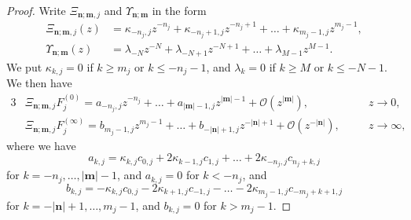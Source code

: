 \documentclass[reqno,centertags,11pt,draft]{amsart}
\begin{document}
\begin{proof}
    Write $\Xi_{\bm{n};\bm{m},j}$ and $\Upsilon_{\bm{n};\bm{m}}$ in the form 
    \begin{align*}\label{eq:lamdba}
         \Xi_{\bm{n};\bm{m},j} (z)&=  \kappa_{-n_j,j}z^{-n_j} + \kappa_{-n_j+1,j}z^{-n_j+1} + \ldots + \kappa_{m_j-1,j}z^{m_j-1}, \\ 
        \Upsilon_{\bm{n};\bm{m}}(z) & =\lambda_{-N}z^{-N} + \lambda_{-N+1}z^{-N+1} + \ldots + \lambda_{M-1}z^{M-1} .
    \end{align*}
    We put $\kappa_{k,j} = 0$ if $k \ge m_j$ or $k\le -n_j-1$, and %
    $\lambda_{k} = 0$ if $k \ge M$ or $k \le -N -1$. We then have 
    \begin{alignat*}{3}
        & \Xi_{\bm{n};\bm{m},j} F_j^{(0)} = a_{-n_j,j}z^{-n_j} + \ldots + a_{|\bm{m}|-1,j}z^{|\bm{m}|-1} + \mathcal{O}(z^{|\bm{m}|}), \quad &&z \rightarrow 0, \\
        & \Xi_{\bm{n};\bm{m},j} F_j^{(\infty)} = b_{m_j-1,j}z^{m_j-1} + \ldots + b_{-|\bm{n}|+1,j}z^{-|\bm{n}|+1} + \mathcal{O}(z^{-|\bm{n}|}), \quad  &&z \rightarrow \infty,
    \end{alignat*}
    where we have
    \begin{equation}
        \label{eq:coefficients of series 1 I}
        a_{k,j}  = \kappa_{k,j} c_{0,j}+ 2\kappa_{k-1,j}c_{1,j} + \ldots + 2\kappa_{-n_j,j} c_{n_j+k,j}
    \end{equation}
    for $k = -n_j,\ldots,|\bm{m}|-1$, and $a_{k,j}=0$ for $k <-n_j$, and
    \begin{equation}
        \label{eq:coefficients of series 2 I}
        b_{k,j} = -\kappa_{k,j} c_{0,j} - 2\kappa_{k+1,j} c_{-1,j} - \ldots - 2 \kappa_{m_j-1,j} c_{-m_j+k+1,j}
    \end{equation}
    for $k = -|\bm{n}|+1,\ldots,m_j-1$, and $b_{k,j} =0$ for $ k>m_j-1$.
    

\end{proof}
\end{document}
